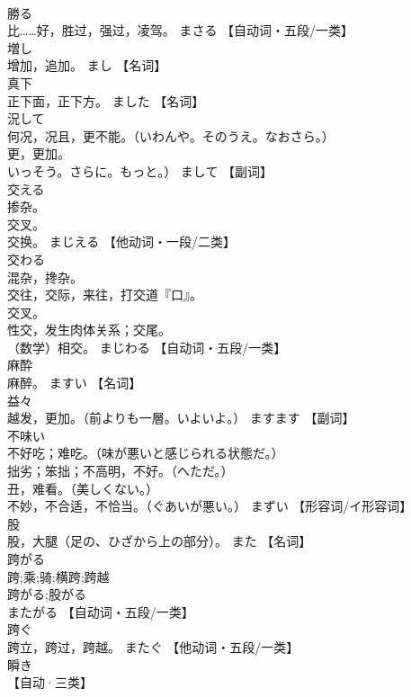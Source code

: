 \documentclass[8pt]{extreport}
\begin{document}
\begin{CJK}{UTF8}{min}
\\	勝る	
\\	比……好，胜过，强过，凌驾。	まさる		【自动词・五段/一类】
\\	増し	
\\	增加，追加。	まし		【名词】
\\	真下	
\\	正下面，正下方。	ました		【名词】
\\	況して	
\\	何况，况且，更不能。（いわんや。そのうえ。なおさら。） 
\\	更，更加。
\\	いっそう。さらに。もっと。）	まして		【副词】
\\	交える	
\\	掺杂。 
\\	交叉。 
\\	交换。	まじえる		【他动词・一段/二类】
\\	交わる	
\\	混杂，搀杂。 
\\	交往，交际，来往，打交道『口』。 
\\	交叉。 
\\	性交，发生肉体关系；交尾。 
\\	（数学）相交。	まじわる		【自动词・五段/一类】
\\	麻酔	
\\	麻醉。	ますい		【名词】
\\	益々	
\\	越发，更加。（前よりも一層。いよいよ。）	ますます		【副词】
\\	不味い	
\\	不好吃；难吃。（味が悪いと感じられる状態だ。） 
\\	拙劣；笨拙；不高明，不好。（へただ。） 
\\	丑，难看。（美しくない。） 
\\	不妙，不合适，不恰当。（ぐあいが悪い。）	まずい		【形容词/イ形容词】
\\	股	
\\	股，大腿（足の、ひざから上の部分）。	また		【名词】
\\	跨がる	
\\	跨;乘;骑;横跨;跨越 
\\	跨がる;股がる 
\\	またがる		【自动词・五段/一类】
\\	跨ぐ	
\\	跨立，跨过，跨越。	またぐ		【他动词・五段/一类】
\\	瞬き	
\\	【自动·三类】 

\end{CJK}
\end{document}

